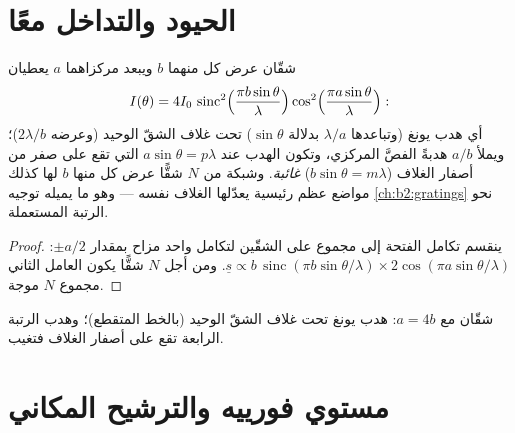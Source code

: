\section{الحيود والتداخل معًا}

\begin{proposition}\label{prop:b2:diffraction:combined}
شقّان عرض كل منهما $b$ ويبعد مركزاهما $a$ يعطيان
\[
I(\theta) = 4I_0\,\operatorname{sinc}^2\Bigl(\frac{\pi b\sin\theta}\lambda\Bigr)\cos^2\Bigl(\frac{\pi a\sin\theta}\lambda\Bigr) :
\]
أي هدب يونغ (وتباعدها $\lambda/a$ بدلالة $\sin\theta$) تحت غلاف
الشقّ الوحيد (وعرضه $2\lambda/b$)؛ ويملأ $a/b$ هدبةً الفصَّ المركزي، وتكون
الهدب عند $a\sin\theta = p\lambda$ التي تقع على صفر من أصفار الغلاف
($b\sin\theta = m\lambda$) \emph{غائبة}. وشبكة من $N$ شقًّا عرض كل منها
$b$ لها كذلك مواضع عظم رئيسية يعدّلها الغلاف نفسه ---
وهو ما يميله توجيه \cref{ch:b2:gratings} نحو الرتبة المستعملة.
\end{proposition}

\begin{proof}
ينقسم تكامل الفتحة إلى مجموع على الشقّين لتكامل
واحد مزاح بمقدار $\pm a/2$: $\underline s \propto b\,\operatorname{sinc}(\pi b\sin\theta/\lambda)
\times2\cos(\pi a\sin\theta/\lambda)$. ومن أجل $N$ شقًّا يكون العامل الثاني
مجموع $N$ موجة.
\end{proof}

\begin{omfigure}

{\small شقّان مع $a = 4b$: هدب يونغ تحت غلاف الشقّ
الوحيد (بالخط المتقطع)؛ وهدب الرتبة الرابعة تقع على أصفار الغلاف
فتغيب.}
\end{omfigure}

\section{مستوي فورييه والترشيح المكاني}

